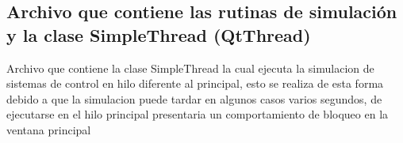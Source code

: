 \documentclass[letterpaper,10pt,spanish]{sphinxmanual}
\begin{document}
\subsection{Archivo que contiene las rutinas de simulación y la clase SimpleThread (QtThread)}
\label{\detokenize{codigos/rutinas_simulacion:archivo-que-contiene-las-rutinas-de-simulacion-y-la-clase-simplethread-qtthread}}\label{\detokenize{codigos/rutinas_simulacion::doc}}\label{\detokenize{codigos/rutinas_simulacion:module-rutinas_simulacion}}
Archivo que contiene la clase SimpleThread la cual ejecuta la simulacion de sistemas de control en hilo diferente al principal, esto se realiza de esta forma debido a que la simulacion puede tardar en algunos casos varios segundos, de ejecutarse en el hilo principal presentaria un comportamiento de bloqueo en la ventana principal
\end{document}
